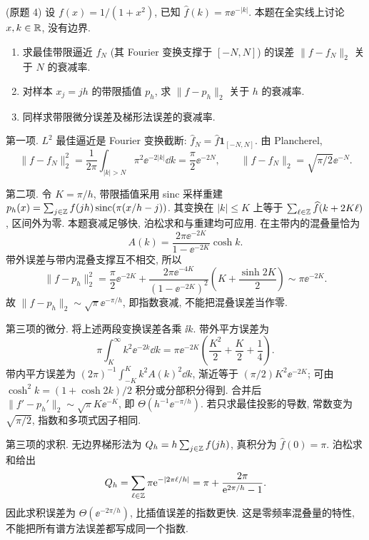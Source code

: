 \begin{exercise}\label{ps8-q4}
(原题 4) 设 $f(x)=1/(1+x^2)$, 已知 $\widehat f(k)=\pi\ee^{-|k|}$. 本题在全实线上讨论 $x,k\in\mathbb R$, 没有边界.
\begin{enumerate}[label=\textbullet]
\item 求最佳带限逼近 $f_N$ (其 Fourier 变换支撑于 $[-N,N]$) 的误差 $\|f-f_N\|_2$ 关于 $N$ 的衰减率.
\item 对样本 $x_j=jh$ 的带限插值 $p_h$, 求 $\|f-p_h\|_2$ 关于 $h$ 的衰减率.
\item 同样求带限微分误差及梯形法误差的衰减率.
\end{enumerate}
\end{exercise}
\begin{solution}
第一项. $L^2$ 最佳逼近是 Fourier 变换截断:
$\widehat f_N=\widehat f\mathbf1_{[-N,N]}$. 由 Plancherel,
\[
\|f-f_N\|_2^2=\frac1{2\pi}\int_{|k|>N}\pi^2\ee^{-2|k|}\dd k
=\frac\pi2\ee^{-2N},\qquad
\|f-f_N\|_2=\sqrt{\pi/2}\ee^{-N}.
\]

第二项. 令 $K=\pi/h$, 带限插值采用 sinc 采样重建
$p_h(x)=\sum_{j\in\mathbb Z} f(jh)\operatorname{sinc}(\pi(x/h-j))$.
其变换在 $|k|\le K$ 上等于 $\sum_{\ell\in\mathbb Z}\widehat f(k+2K\ell)$, 区间外为零. 本题衰减足够快, 泊松求和与重建均可应用. 在主带内的混叠量恰为
\[
A(k)=\frac{2\pi\ee^{-2K}}{1-\ee^{-2K}}\cosh k.
\]
带外误差与带内混叠支撑互不相交, 所以
\[
\|f-p_h\|_2^2=\frac\pi2\ee^{-2K}
+\frac{2\pi\ee^{-4K}}{(1-\ee^{-2K})^2}
\left(K+\frac{\sinh2K}{2}\right)
\sim\pi\ee^{-2K}.
\]
故 $\|f-p_h\|_2\sim\sqrt\pi\ee^{-\pi/h}$, 即指数衰减, 不能把混叠误差当作零.

第三项的微分. 将上述两段变换误差各乘 $\ii k$. 带外平方误差为
\[
\pi\int_K^\infty k^2\ee^{-2k}\dd k
=\pi\ee^{-2K}\left(\frac{K^2}{2}+\frac K2+\frac14\right).
\]
带内平方误差为 $(2\pi)^{-1}\int_{-K}^Kk^2A(k)^2\dd k$, 渐近等于 $(\pi/2)K^2\ee^{-2K}$; 可由 $\cosh^2k=(1+\cosh2k)/2$ 积分或分部积分得到. 合并后
$\|f'-p_h'\|_2\sim\sqrt\pi K\ee^{-K}$,
即 $\Theta(h^{-1}\ee^{-\pi/h})$. 若只求最佳投影的导数, 常数变为 $\sqrt{\pi/2}$, 指数和多项式因子相同.

第三项的求积. 无边界梯形法为 $Q_h=h\sum_{j\in\mathbb Z}f(jh)$, 真积分为 $\widehat f(0)=\pi$. 泊松求和给出
\[
Q_h=\sum_{\ell\in\mathbb Z}\pi\mathrm e^{-|2\pi\ell/h|}
=\pi+\frac{2\pi}{\mathrm e^{2\pi/h}-1}.
\]
因此求积误差为 $\Theta(\ee^{-2\pi/h})$, 比插值误差的指数更快. 这是零频率混叠量的特性, 不能把所有谱方法误差都写成同一个指数.
\end{solution}

